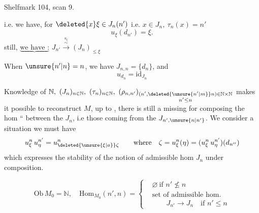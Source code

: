 Shelfmark 104, scan 9.

i.e. we have, for \(\deleted{x}\xi\in J_n(n')\) i.e. \(x\in J_n,\ \tau_n(x)=n'\)
\[
 u_\xi(d_{n'})=\xi .
\]
   still, \(\underbrace{\text{we have :}}\)  \(J_{n'}\xrightarrow{\overset{u_\xi}{\sim}}(J_n)_{\leq\xi}\)

When \(\unsure{n'|n}=n\), we have \(J_{n,n}=\{d_n\}\), and
\[
 u_{d_n}=\mathrm{id}_{J_n}
\]

Knowledge of \(\mathbb N,\ (J_n)_{n\in\mathbb N},\ (\tau_n)_{n\in\mathbb N},\
(\rho_{n,n'})_{\substack{(n',\deleted{\unsure{n'|m}}n)\in\mathbb N\times\mathbb N\\ n'\leq n}}\) makes it possible to reconstruct   \(M\), up to  , there is still a   missing for composing the hom `` between the \(J_n\), i.e those coming from the \(J_{n',\unsure{n|n'}}\).  We consider a situation
we must have
\[
 u_\xi^n\,u_\eta^{n'}=u_{\deleted{\unsure{\xi|a}}\zeta}^{n}
 \qquad\text{where}\quad \zeta=u_\xi^n(\eta)=
 (u_\xi^n\,u_\eta^{n'})(d_{n''})
\]
which expresses the  stability of the notion of admissible hom  \(J_n\) under composition.

 
\[
 \mathrm{Ob}\,M_0=\mathbb N,\quad \mathrm{Hom}_{M_0}(n',n)=
 \left\{\begin{aligned}
 &\varnothing\ \text{if }n'\nleq n\\
 &\text{set of admissible hom.}\\
 &\qquad J_{n'}\to J_n\quad\text{if }n'\leq n
 \end{aligned}\right.
\]

